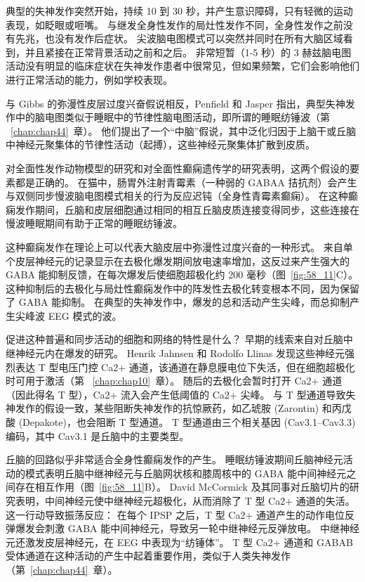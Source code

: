 典型的失神发作突然开始，持续 10 到 30 秒，并产生意识障碍，只有轻微的运动表现，如眨眼或咂嘴。
与继发全身性发作的局灶性发作不同，全身性发作之前没有先兆，也没有发作后症状。
尖波脑电图模式可以突然并同时在所有大脑区域看到，并且紧接在正常背景活动之前和之后。
非常短暂（1-5 秒）的 3 赫兹脑电图活动没有明显的临床症状在失神发作患者中很常见，但如果频繁，它们会影响他们进行正常活动的能力，例如学校表现。


与 Gibbs 的弥漫性皮层过度兴奋假说相反，Penfield 和 Jasper 指出，典型失神发作中的脑电图类似于睡眠中的节律性脑电图活动，即所谓的睡眠纺锤波（第 ~\ref{chap:chap44}~章）。
他们提出了一个“中脑”假说，其中泛化归因于上脑干或丘脑中神经元聚集体的节律性活动（起搏），这些神经元聚集体扩散到皮质。


对全面性发作动物模型的研究和对全面性癫痫遗传学的研究表明，这两个假设的要素都是正确的。
在猫中，肠胃外注射青霉素（一种弱的 GABAA 拮抗剂）会产生与双侧同步慢波脑电图模式相关的行为反应迟钝（全身性青霉素癫痫）。
在这种癫痫发作期间，丘脑和皮层细胞通过相同的相互丘脑皮质连接变得同步，这些连接在慢波睡眠期间有助于正常的睡眠纺锤波。


这种癫痫发作在理论上可以代表大脑皮层中弥漫性过度兴奋的一种形式。
来自单个皮层神经元的记录显示在去极化爆发期间放电速率增加，这反过来产生强大的 GABA 能抑制反馈，在每次爆发后使细胞超极化约 200 毫秒（图~\ref{fig:58_11}C）。
这种抑制后的去极化与局灶性癫痫发作中的阵发性去极化转变根本不同，因为保留了 GABA 能抑制。
在典型的失神发作中，爆发的总和活动产生尖峰，而总抑制产生尖峰波 EEG 模式的波。


促进这种普遍和同步活动的细胞和网络的特性是什么？
早期的线索来自对丘脑中继神经元内在爆发的研究。
Henrik Jahnsen 和 Rodolfo Llinas 发现这些神经元强烈表达 T 型电压门控 Ca2+ 通道，该通道在静息膜电位下失活，但在细胞超极化时可用于激活（第 ~\ref{chap:chap10}~章）。
随后的去极化会暂时打开 Ca2+ 通道（因此得名 T 型），Ca2+ 流入会产生低阈值的 Ca2+ 尖峰。
与 T 型通道导致失神发作的假设一致，某些阻断失神发作的抗惊厥药，如乙琥胺 (Zarontin) 和丙戊酸 (Depakote)，也会阻断 T 型通道。
T 型通道由三个相关基因 (Cav3.1–Cav3.3) 编码，其中 Cav3.1 是丘脑中的主要类型。


丘脑的回路似乎非常适合全身性癫痫发作的产生。
睡眠纺锤波期间丘脑神经元活动的模式表明丘脑中继神经元与丘脑网状核和膝周核中的 GABA 能中间神经元之间存在相互作用（图~\ref{fig:58_11}B）。
David McCormick 及其同事对丘脑切片的研究表明，中间神经元使中继神经元超极化，从而消除了 T 型 Ca2+ 通道的失活。
这一行动导致振荡反应：
在每个 IPSP 之后，T 型 Ca2+ 通道产生的动作电位反弹爆发会刺激 GABA 能中间神经元，导致另一轮中继神经元反弹放电。
中继神经元还激发皮层神经元，在 EEG 中表现为“纺锤体”。
T 型 Ca2+ 通道和 GABAB 受体通道在这种活动的产生中起着重要作用，类似于人类失神发作（第~\ref{chap:chap44}~章）。


